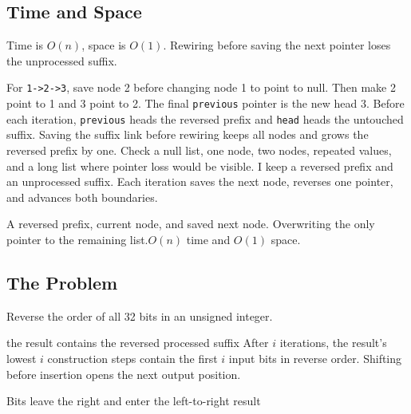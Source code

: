 \subsection{Time and Space}
Time is \(O(n)\), space is \(O(1)\). Rewiring before saving the next pointer
loses the unprocessed suffix.

\lessonexpansion
  {For \texttt{1->2->3}, save node 2 before changing node 1 to point to null.
   Then make 2 point to 1 and 3 point to 2. The final \texttt{previous}
   pointer is the new head 3.}
  {Before each iteration, \texttt{previous} heads the reversed prefix and
   \texttt{head} heads the untouched suffix. Saving the suffix link before
   rewiring keeps all nodes and grows the reversed prefix by one.}
  {Check a null list, one node, two nodes, repeated values, and a long list
   where pointer loss would be visible.}
  {I keep a reversed prefix and an unprocessed suffix. Each iteration
   saves the next node, reverses one pointer, and advances both boundaries.}

  {A reversed prefix, current node, and saved next node.}
  {Overwriting the only pointer to the remaining list.}{$O(n)$ time and $O(1)$ space.}



\subsection{The Problem}
Reverse the order of all 32 bits in an unsigned integer.

\begin{invariantbox}{the result contains the reversed processed suffix}
After \(i\) iterations, the result's lowest \(i\) construction steps contain
the first \(i\) input bits in reverse order. Shifting before insertion opens
the next output position.
\end{invariantbox}

\begin{visualbox}{Bits leave the right and enter the left-to-right result}
\centering
{}
\end{visualbox}

